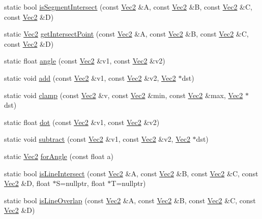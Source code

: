 \begin{DoxyCompactItemize}
\item 
static bool \hyperlink{classVec2_a2f6e61e0994a71c17e6ba614e1d81c06}{is\+Segment\+Intersect} (const \hyperlink{classVec2}{Vec2} \&A, const \hyperlink{classVec2}{Vec2} \&B, const \hyperlink{classVec2}{Vec2} \&C, const \hyperlink{classVec2}{Vec2} \&D)
\item 
static \hyperlink{classVec2}{Vec2} \hyperlink{classVec2_ac0ffe8d77f93b1d6fa13d786d079f382}{get\+Intersect\+Point} (const \hyperlink{classVec2}{Vec2} \&A, const \hyperlink{classVec2}{Vec2} \&B, const \hyperlink{classVec2}{Vec2} \&C, const \hyperlink{classVec2}{Vec2} \&D)
\item 
static float \hyperlink{classVec2_a57e7673ee790c5825b2fd6992aec2de3}{angle} (const \hyperlink{classVec2}{Vec2} \&v1, const \hyperlink{classVec2}{Vec2} \&v2)
\item 
static void \hyperlink{classVec2_aba6e4df1c6af7b575fb4e501d39e39d1}{add} (const \hyperlink{classVec2}{Vec2} \&v1, const \hyperlink{classVec2}{Vec2} \&v2, \hyperlink{classVec2}{Vec2} $\ast$dst)
\item 
static void \hyperlink{classVec2_a6ac327ca40c0457b85fb9ee3c1a6e1fa}{clamp} (const \hyperlink{classVec2}{Vec2} \&v, const \hyperlink{classVec2}{Vec2} \&min, const \hyperlink{classVec2}{Vec2} \&max, \hyperlink{classVec2}{Vec2} $\ast$dst)
\item 
static float \hyperlink{classVec2_ab2482a8fb50ff53c53ac024a899dad44}{dot} (const \hyperlink{classVec2}{Vec2} \&v1, const \hyperlink{classVec2}{Vec2} \&v2)
\item 
static void \hyperlink{classVec2_a8bd709224a613e76c40223dcc873f574}{subtract} (const \hyperlink{classVec2}{Vec2} \&v1, const \hyperlink{classVec2}{Vec2} \&v2, \hyperlink{classVec2}{Vec2} $\ast$dst)
\item 
static \hyperlink{classVec2}{Vec2} \hyperlink{classVec2_aba30a4b093635bdd1fa4e329e93455d9}{for\+Angle} (const float a)
\item 
static bool \hyperlink{classVec2_af2a542c6d0f65a8ba71ea1480d19d214}{is\+Line\+Intersect} (const \hyperlink{classVec2}{Vec2} \&A, const \hyperlink{classVec2}{Vec2} \&B, const \hyperlink{classVec2}{Vec2} \&C, const \hyperlink{classVec2}{Vec2} \&D, float $\ast$S=nullptr, float $\ast$T=nullptr)
\item 
static bool \hyperlink{classVec2_a56a8da20b34addc4bf717064f8ecc415}{is\+Line\+Overlap} (const \hyperlink{classVec2}{Vec2} \&A, const \hyperlink{classVec2}{Vec2} \&B, const \hyperlink{classVec2}{Vec2} \&C, const \hyperlink{classVec2}{Vec2} \&D)
\item 

\end{DoxyCompactItemize}
